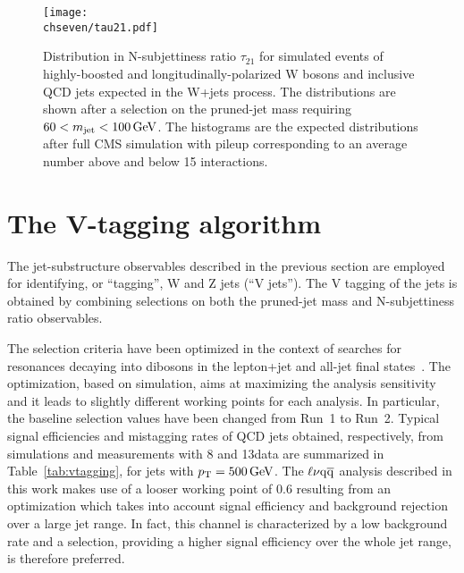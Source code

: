 \begin{figure}[!htb]
 \begin{center}
  \texttt{[image: \\chseven/tau21.pdf]}
 \end{center}
 \caption{\small Distribution in N-subjettiness ratio $\tau_{21}$ for simulated events of highly-boosted and longitudinally-polarized W bosons and inclusive QCD jets expected in the W+jets process. The distributions are shown after a selection on the pruned-jet mass requiring $60 < m_{\text{jet}} < 100\,\text{Ge\hspace{-.08em}V}$. The histograms are the expected distributions after full CMS simulation with pileup corresponding to an average number above and below 15 interactions.
 }
 \label{fig:tau21}
\end{figure}

\section{The V-tagging algorithm}
\label{sec:vtagging}

The jet-substructure observables described in the previous section are employed for identifying, or ``tagging'', W and Z jets (``V jets''). The V tagging of the jets is obtained by combining selections on both the pruned-jet mass \mJ and N-subjettiness ratio \nsubj observables. %

The selection criteria have been optimized in the context of searches for resonances decaying into dibosons in the lepton+jet and all-jet final states~\cite{Khachatryan:2014gha,Khachatryan:2014hpa,CMS-PAS-EXO-15-002}. The optimization, based on simulation, aims at maximizing the analysis sensitivity and it leads to slightly different working points for each analysis. In particular, the baseline selection values have been changed from Run~1 to Run~2. Typical signal efficiencies and mistagging rates of QCD jets obtained, respectively, from simulations and measurements with 8 and 13\TeV data are summarized in Table~\ref{tab:vtagging}, for jets with $p_{\mathrm{T}} = 500\,\text{Ge\hspace{-.08em}V}$.
The $\ell\nu\mathrm{q}\overline{\mathrm{q}}$ analysis described in this work makes use of a looser \nsubj working point of 0.6 resulting from an optimization which takes into account signal efficiency and background rejection over a large jet \pt range.
In fact, this channel is characterized by a low background rate and a \nsubj selection, providing a higher signal efficiency over the whole jet \pt range, is therefore preferred.\\

